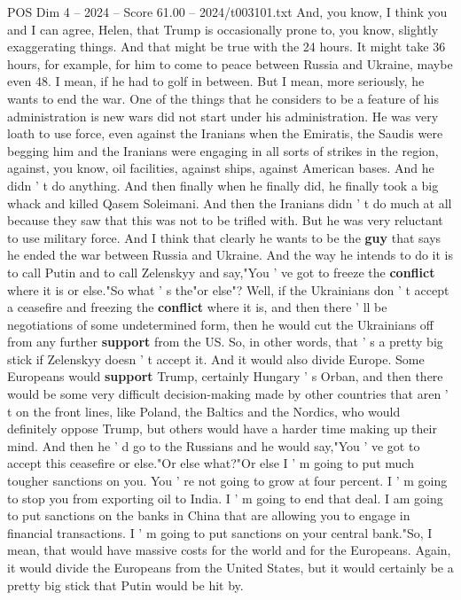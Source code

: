 \begin{textsample}{POS Dim 4 – 2024 – Score 61.00 – 2024/t003101.txt}
And, you know, I think you and I can agree, Helen, that Trump is occasionally prone to, you know, slightly exaggerating things.
And that might be true with the 24 hours.
It might take 36 hours, for example, for him to come to peace between Russia and Ukraine, maybe even 48.
I mean, if he had to golf in between.
But I mean, more seriously, he wants to end the war.
One of the things that he considers to be a feature of his administration is new wars did not start under his administration.
He was very loath to use force, even against the Iranians when the Emiratis, the Saudis were begging him and the Iranians were engaging in all sorts of strikes in the region, against, you know, oil facilities, against ships, against American bases.
And he didn ' t do anything.
And then finally when he finally did, he finally took a big whack and killed Qasem Soleimani.
And then the Iranians didn ' t do much at all because they saw that this was not to be trifled with.
But he was very reluctant to use military force.
And I think that clearly he wants to be the \textbf{guy} that says he ended the war between Russia and Ukraine.
And the way he intends to do it is to call Putin and to call Zelenskyy and say,"You ' ve got to freeze the \textbf{conflict} where it is or else."So what ' s the"or else"?
Well, if the Ukrainians don ' t accept a ceasefire and freezing the \textbf{conflict} where it is, and then there ' ll be negotiations of some undetermined form, then he would cut the Ukrainians off from any further \textbf{support} from the US.
So, in other words, that ' s a pretty big stick if Zelenskyy doesn ' t accept it.
And it would also divide Europe.
Some Europeans would \textbf{support} Trump, certainly Hungary ' s Orban, and then there would be some very difficult decision-making made by other countries that aren ' t on the front lines, like Poland, the Baltics and the Nordics, who would definitely oppose Trump, but others would have a harder time making up their mind.
And then he ' d go to the Russians and he would say,"You ' ve got to accept this ceasefire or else."Or else what?"Or else I ' m going to put much tougher sanctions on you.
You ' re not going to grow at four percent.
I ' m going to stop you from exporting oil to India.
I ' m going to end that deal.
I am going to put sanctions on the banks in China that are allowing you to engage in financial transactions.
I ' m going to put sanctions on your central bank."So, I mean, that would have massive costs for the world and for the Europeans.
Again, it would divide the Europeans from the United States, but it would certainly be a pretty big stick that Putin would be hit by.

\end{textsample}
